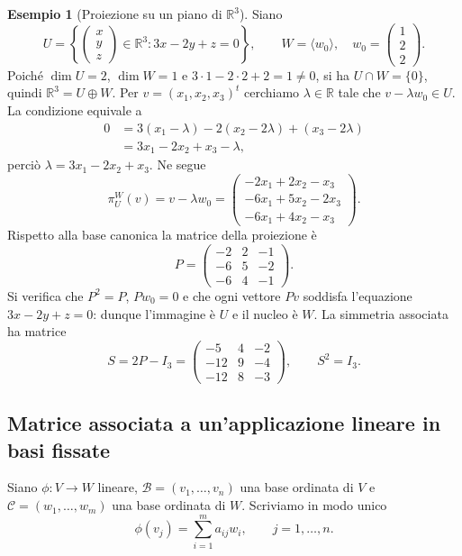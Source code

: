 \documentclass[11pt,a4paper]{article}
\newcommand{\RR}{\mathbb{R}}
\theoremstyle{plain}
\theoremstyle{definition}
\newtheorem{esempio}[prop]{Esempio}
\theoremstyle{remark}
\begin{document}
\begin{esempio}[Proiezione su un piano di $\RR^3$]
Siano
\[
 U=\left\{\begin{pmatrix}x\\y\\z\end{pmatrix}\in\RR^3:
 3x-2y+z=0\right\},\qquad
 W=\langle w_0\rangle,\quad
 w_0=\begin{pmatrix}1\\2\\2\end{pmatrix}.
\]
Poiché $\dim U=2$, $\dim W=1$ e
$3\cdot1-2\cdot2+2=1\ne0$, si ha $U\cap W=\{0\}$,
quindi $\RR^3=U\oplus W$.
Per $v=(x_1,x_2,x_3)^t$ cerchiamo $\lambda\in\RR$ tale che
$v-\lambda w_0\in U$. La condizione equivale a
\begin{align*}
 0&=3(x_1-\lambda)-2(x_2-2\lambda)+(x_3-2\lambda)\\
  &=3x_1-2x_2+x_3-\lambda,
\end{align*}
perciò $\lambda=3x_1-2x_2+x_3$. Ne segue
\[
 \pi_U^W(v)=v-\lambda w_0
 =\begin{pmatrix}
 -2x_1+2x_2-x_3\\
 -6x_1+5x_2-2x_3\\
 -6x_1+4x_2-x_3
 \end{pmatrix}.
\]
Rispetto alla base canonica la matrice della proiezione è
\[
 P=\begin{pmatrix}
 -2&2&-1\\-6&5&-2\\-6&4&-1
 \end{pmatrix}.
\]
Si verifica che $P^2=P$, $Pw_0=0$ e che ogni vettore $Pv$
soddisfa l'equazione $3x-2y+z=0$: dunque l'immagine è $U$
e il nucleo è $W$. La simmetria associata ha matrice
\[
 S=2P-I_3=
 \begin{pmatrix}-5&4&-2\\-12&9&-4\\-12&8&-3\end{pmatrix},
 \qquad S^2=I_3.
\]
\end{esempio}

\subsection{Matrice associata a un'applicazione lineare in basi fissate}

Siano $\phi:V\to W$ lineare, $\mathcal B=(v_1,\ldots,v_n)$
una base ordinata di $V$ e $\mathcal C=(w_1,\ldots,w_m)$
una base ordinata di $W$. Scriviamo in modo unico
\[
 \phi(v_j)=\sum_{i=1}^m a_{ij}w_i,
 \qquad j=1,\ldots,n.
\]
\end{document}
